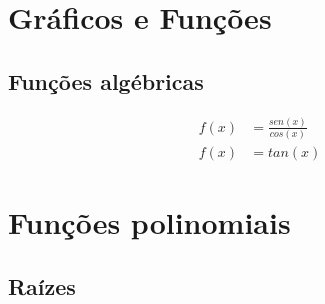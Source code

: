 \renewcommand{\sectionauthor}{Prof. Rafael Simões}

\begin{multicols*}{2}
        
    \section*{Gráficos e Funções}
    \lipsum[1]

    \subsection*{Funções algébricas}
    \lipsum[1-2]
    
   
    \begin{align}
        f(x) &= \frac{sen(x)}{cos(x)} \\[10pt]
        f(x) &= tan(x)
    \end{align}
    

    \newpage
    \section*{Funções polinomiais}
    \lipsum[1]

    \subsection*{Raízes}
    \lipsum[1-2]    
    
\end{multicols*}